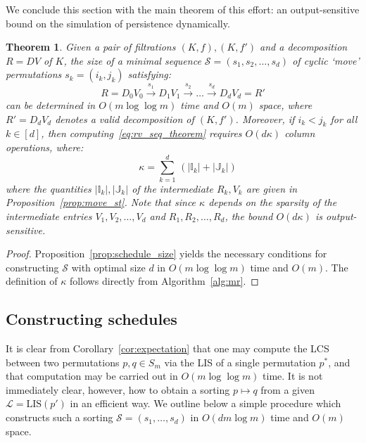 \documentclass[sn-mathphys]{sn-jnl}
\newtheorem{theorem}{Theorem}
\begin{document}
We conclude this section with the main theorem of this effort: an output-sensitive bound on the simulation of persistence dynamically.
  \begin{theorem}\label{prop:sparsity_result}
   Given a pair of filtrations $(K,f), (K,f')$ and a decomposition $R = DV$ of $K$, the size of a minimal sequence $\mathcal{S} = \left( s_1, s_2, \dots, s_d \right)$ of cyclic `move' permutations $s_k = (i_k, j_k)$ satisfying: 
   	\begin{equation}\label{eq:rv_seq_theorem}
   		R = D_0 V_0 \overset{s_1}{\to} D_1 V_{1} \overset{s_2}{\to} \dots \overset{s_d}{\to} D_d V_{d} = R'
   	\end{equation}
   	can be determined in $O(m \log \log m)$ time and $O(m)$ space, where $R' = D_d V_d$ denotes a valid decomposition of $(K, f')$. 
   	Moreover, if $i_k < j_k$ for all $k \in [d]$, then computing~\eqref{eq:rv_seq_theorem} requires $O(d\kappa)$ column operations, where:	  
   	$$  \quad \kappa = \sum\limits_{k = 1}^d \, (\lvert \mathbb{I}_{k} \rvert + \lvert \mathbb{J}_{k} \rvert) $$
	where the quantities $\lvert \mathbb{I}_{k} \rvert, \lvert \mathbb{J}_{k} \rvert$ of the intermediate $R_k, V_k$ are given in Proposition~\ref{prop:move_st}. Note that since $\kappa$ depends on the sparsity of the intermediate entries $V_1, V_2, \dots, V_d$ and $R_1, R_2, \dots, R_d$, the bound $O(d \kappa)$ is output-sensitive. 
\end{theorem}
\begin{proof} \normalsize
	Proposition~\ref{prop:schedule_size} yields the necessary conditions for constructing $\mathcal{S}$  with optimal size $d$ in $O(m \log \log m)$ time and $O(m)$. The definition of $\kappa$ follows directly from Algorithm~\ref{alg:mr}. 
\end{proof}

 
\subsection{Constructing schedules}\label{sec:schedule_construction}
It is clear from Corollary~\ref{cor:expectation} that one may compute the LCS between two permutations $p, q \in S_m$ via the LIS of a single permutation $p^\ast$, and that computation may be carried out in $O(m \log \log m)$ time. 
It is not immediately clear, however, how to obtain a sorting $p \mapsto q$ from a given $\mathcal{L} = \mathrm{LIS}(p')$ in an efficient way. We outline below a simple procedure which constructs such a sorting $\mathcal{S} = (s_1, \dots, s_d)$ in $O(dm\log m)$ time and $O(m)$ space. 
 
\end{document}
